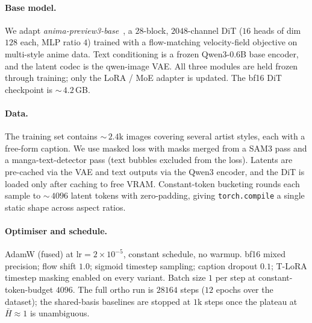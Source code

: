 \documentclass[10pt]{article}
\begin{document}
\paragraph{Base model.}
We adapt \emph{anima-preview3-base}~\cite{anima2026}, a $28$-block,
$2048$-channel DiT ($16$ heads of dim $128$ each, MLP ratio $4$)
trained with a flow-matching velocity-field objective on multi-style
anime data. Text conditioning is a frozen Qwen3-0.6B base encoder,
and the latent codec is the qwen-image VAE. All three modules are
held frozen through training; only the LoRA / MoE adapter is updated.
The bf16 DiT checkpoint is ${\sim}\,4.2$\,GB.

\paragraph{Data.}
The training set contains ${\sim}\,2.4\text{k}$ images covering
several artist styles, each with a free-form caption. We use masked
loss with masks merged from a SAM3 pass and a manga-text-detector pass
(text bubbles excluded from the loss). Latents are pre-cached via the
VAE and text outputs via the Qwen3 encoder, and the DiT is loaded
only after caching to free VRAM. Constant-token bucketing rounds each
sample to ${\sim}\,4096$ latent tokens with zero-padding, giving
\texttt{torch.compile} a single static shape across aspect ratios.

\paragraph{Optimiser and schedule.}
AdamW (fused) at $\mathrm{lr}\!=\!2\!\times\!10^{-5}$, constant
schedule, no warmup. bf16 mixed precision; flow shift $1.0$;
sigmoid timestep sampling; caption dropout $0.1$; T-LoRA timestep
masking enabled on every variant. Batch size $1$ per step at
constant-token-budget $4096$. The full ortho run is $28164$ steps
($12$ epochs over the dataset); the shared-basis baselines are stopped
at $1\text{k}$ steps once the plateau at $\bar H\!\approx\!1$ is
unambiguous.
\end{document}
